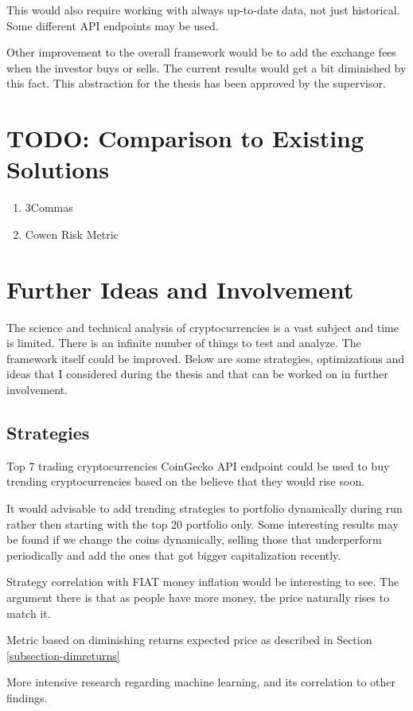 This would also require working with always up-to-date data, not just historical. Some different API endpoints may be used.

Other improvement to the overall framework would be to add the exchange fees when the investor buys or sells. The current results would get a bit diminished by this fact. This abstraction for the thesis has been approved by the supervisor.

\section{TODO: Comparison to Existing Solutions}
\begin{enumerate}
    \item 3Commas
    \item Cowen Risk Metric
\end{enumerate}

\section{Further Ideas and Involvement}
The science and technical analysis of cryptocurrencies is a vast subject and time is limited. There is an infinite number of things to test and analyze. The framework itself could be improved. Below are some strategies, optimizations and ideas that I considered during the thesis and that can be worked on in further involvement.

\subsection*{Strategies}
Top 7 trading cryptocurrencies CoinGecko API endpoint could be used to buy trending cryptocurrencies based on the believe that they would rise soon.

It would advisable to add trending strategies to portfolio dynamically during run rather then starting with the top 20 portfolio only. Some interesting results may be found if we change the coins dynamically, selling those that underperform periodically and add the ones that got bigger capitalization recently.

Strategy correlation with FIAT money inflation would be interesting to see. The argument there is that as people have more money, the price naturally rises to match it.

Metric based on diminishing returns expected price as described in Section \ref{subsection-dimreturns}

More intensive research regarding machine learning, and its correlation to other findings.

